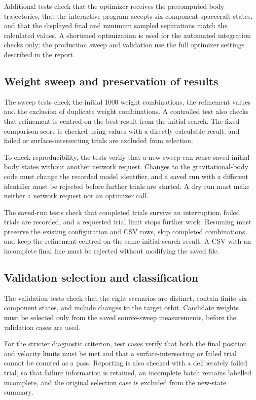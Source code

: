 \documentclass[11pt,letterpaper]{article}
\begin{document}
Additional tests check that the optimizer receives the precomputed
body trajectories, that the interactive program accepts six-component
spacecraft states, and that the displayed final and minimum sampled
separations match the calculated values. A shortened optimization is
used for the automated integration checks only; the production sweep
and validation use the full optimizer settings described in the report.

\subsection{Weight sweep and preservation of results}
The sweep tests check the initial 1000 weight combinations, the refinement
values and the exclusion of duplicate weight combinations. A
controlled test also checks that refinement is centred on the best
result from the initial search. The fixed comparison score is checked using values
with a directly calculable result, and failed or surface-intersecting
trials are excluded from selection.

To check reproducibility, the tests verify that a new sweep can reuse
saved initial body states without another network request. Changes
to the gravitational-body code must change the recorded model
identifier, and a saved run with a different identifier must be
rejected before further trials are started. A dry run must make
neither a network request nor an optimizer call.

The saved-run tests check that completed trials survive an interruption,
failed trials are recorded, and a requested trial limit stops further
work. Resuming must preserve the existing configuration and CSV rows,
skip completed combinations, and keep the refinement centred on the
same initial-search result. A CSV with an incomplete final line must be
rejected without modifying the saved file.

\subsection{Validation selection and classification}
The validation tests check that the eight scenarios are distinct,
contain finite six-component states, and include changes to the
target orbit. Candidate weights must be selected only from the
saved source-sweep measurements, before the validation cases are used.

For the stricter diagnostic criterion, test cases verify that both
the final position and velocity limits must be met and that a
surface-intersecting or failed trial cannot be counted as a pass.
Reporting is also checked with a deliberately failed trial, so that
failure information is retained, an incomplete batch remains labelled
incomplete, and the original selection case is excluded from the
new-state summary.


\end{document}
